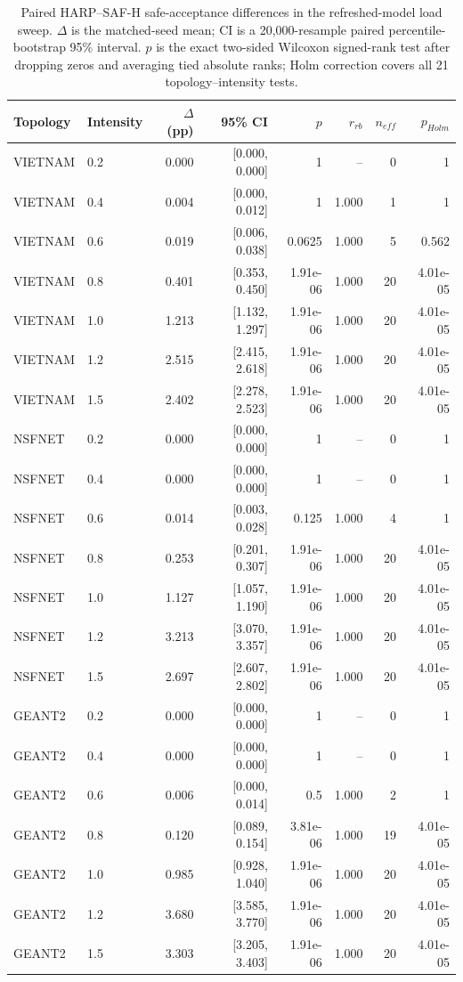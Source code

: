 \begin{table}[p]
\centering
\color{revisiongreen}\small
\begin{tabular}{llrrrrrr}
\toprule
Topology & Intensity & $\Delta$ (pp) & 95\% CI & $p$ & $r_{rb}$ & $n_{eff}$ & $p_{Holm}$ \\
\midrule
VIETNAM & 0.2 & 0.000 & [0.000, 0.000] & 1 & -- & 0 & 1 \\
VIETNAM & 0.4 & 0.004 & [0.000, 0.012] & 1 & 1.000 & 1 & 1 \\
VIETNAM & 0.6 & 0.019 & [0.006, 0.038] & 0.0625 & 1.000 & 5 & 0.562 \\
VIETNAM & 0.8 & 0.401 & [0.353, 0.450] & 1.91e-06 & 1.000 & 20 & 4.01e-05 \\
VIETNAM & 1.0 & 1.213 & [1.132, 1.297] & 1.91e-06 & 1.000 & 20 & 4.01e-05 \\
VIETNAM & 1.2 & 2.515 & [2.415, 2.618] & 1.91e-06 & 1.000 & 20 & 4.01e-05 \\
VIETNAM & 1.5 & 2.402 & [2.278, 2.523] & 1.91e-06 & 1.000 & 20 & 4.01e-05 \\
NSFNET & 0.2 & 0.000 & [0.000, 0.000] & 1 & -- & 0 & 1 \\
NSFNET & 0.4 & 0.000 & [0.000, 0.000] & 1 & -- & 0 & 1 \\
NSFNET & 0.6 & 0.014 & [0.003, 0.028] & 0.125 & 1.000 & 4 & 1 \\
NSFNET & 0.8 & 0.253 & [0.201, 0.307] & 1.91e-06 & 1.000 & 20 & 4.01e-05 \\
NSFNET & 1.0 & 1.127 & [1.057, 1.190] & 1.91e-06 & 1.000 & 20 & 4.01e-05 \\
NSFNET & 1.2 & 3.213 & [3.070, 3.357] & 1.91e-06 & 1.000 & 20 & 4.01e-05 \\
NSFNET & 1.5 & 2.697 & [2.607, 2.802] & 1.91e-06 & 1.000 & 20 & 4.01e-05 \\
GEANT2 & 0.2 & 0.000 & [0.000, 0.000] & 1 & -- & 0 & 1 \\
GEANT2 & 0.4 & 0.000 & [0.000, 0.000] & 1 & -- & 0 & 1 \\
GEANT2 & 0.6 & 0.006 & [0.000, 0.014] & 0.5 & 1.000 & 2 & 1 \\
GEANT2 & 0.8 & 0.120 & [0.089, 0.154] & 3.81e-06 & 1.000 & 19 & 4.01e-05 \\
GEANT2 & 1.0 & 0.985 & [0.928, 1.040] & 1.91e-06 & 1.000 & 20 & 4.01e-05 \\
GEANT2 & 1.2 & 3.680 & [3.585, 3.770] & 1.91e-06 & 1.000 & 20 & 4.01e-05 \\
GEANT2 & 1.5 & 3.303 & [3.205, 3.403] & 1.91e-06 & 1.000 & 20 & 4.01e-05 \\
\bottomrule
\end{tabular}
\caption{Paired HARP--SAF-H safe-acceptance differences in the refreshed-model load sweep. $\Delta$ is the matched-seed mean; CI is a 20,000-resample paired percentile-bootstrap 95\% interval. $p$ is the exact two-sided Wilcoxon signed-rank test after dropping zeros and averaging tied absolute ranks; Holm correction covers all 21 topology--intensity tests.}
\label{tab:load_sweep_paired_statistics}
\end{table}
